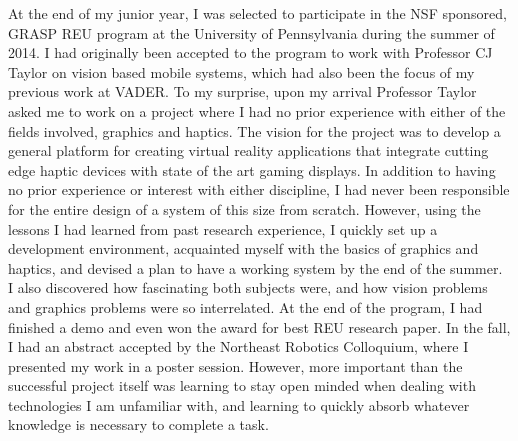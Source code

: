 \documentclass[12pt]{article}
\begin{document}
At the end of my junior year, I was selected to participate in the NSF
sponsored, GRASP REU program at the University of Pennsylvania during the
summer of 2014. I had originally been accepted to the program to work with
Professor CJ Taylor on vision based mobile systems, which had also been the focus
of my previous work at VADER. To my surprise, upon my arrival Professor Taylor
asked me to work on a project where I had no prior experience with either of
the fields involved, graphics and haptics. The vision for the project was to
develop a general platform for creating virtual reality applications that
integrate cutting edge haptic devices with state of the art gaming displays.
In addition to having no prior experience or interest with either discipline, I
had never been responsible for the entire design of a system of this size from
scratch.  However, using the lessons I had learned from past research
experience, I quickly set up a development environment, acquainted myself with
the basics of graphics and haptics, and devised a plan to have a working system
by the end of the summer. I also discovered how fascinating both subjects were,
and how vision problems and graphics problems were so interrelated. At the end
of the program, I had finished a demo and even won the award for best REU
research paper. In the fall, I had an abstract accepted by the Northeast
Robotics Colloquium, where I presented my work in a poster session.  However,
more important than the successful project itself was learning to stay open
minded when dealing with technologies I am unfamiliar with, and learning to
quickly absorb whatever knowledge is necessary to complete a task.
\end{document}
